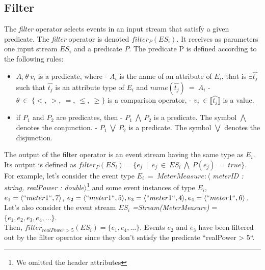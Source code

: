   \subsection{Filter}
  The \textit{filter} operator selects events in an input stream that satisfy a given predicate. The \textit{filter} operator is denoted $filter_P (ES_i)$. It receives as parameters one input stream $ES_i$ and a predicate $P$.
  The predicate P is defined according to the following rules:
  \begin{itemize}
   \item $A_i\ \theta\ v_i$ is a predicate, where
      \subitem- $A_i$ is the name of an attribute of $E_i$, that is $\exists \hat{t_j}$ such that $\hat{t_j}$ is an attribute type of $E_i$ and $name(\hat{t_j})\ =\ A_i$ 
      \subitem- $\theta\ \in\ \{<,\ >,\ =,\ \leq,\ \geq\}$ is a comparison operator,
      \subitem- $v_i\ \in \llbracket \hat{t_j}\rrbracket$ is a value. 
    \item if $P_1$ and $P_2$ are predicates, then
      \subitem- $P_1\ \bigwedge\ P_2$ is a predicate. The symbol $\bigwedge$ denotes the conjunction.
      \subitem- $P_1\ \bigvee\ P_2$ is a predicate. The symbol $\bigvee$ denotes the disjunction.
  \end{itemize}
 The output of the filter operator is an event stream having the same type as $E_i$. Its output is defined as
 $filter_P(ES_i) = \{e_j\ \mid\ e_j\ \in\ ES_i\ \bigwedge\ P(e_j)\ =\ true\}$.
  \\ For example, let's consider the event type $E_i\ =\ MeterMeasure:\langle$ \textit{meterID : string, realPower : double}$\rangle$\footnote{We omitted the header attributes} and some event instances of type $E_i$, $e_1=\langle``meter1``, 7\rangle$, $e_2=\langle``meter1``, 5\rangle, e_3=\langle``meter1``, 4\rangle, e_4=\langle``meter1``, 6\rangle$. 
  \\Let's also consider the event stream $ES_i$ \textit{=Stream(MeterMeasure)} = $\{e_1, e_2, e_3, e_4, ... \}$. 
  \\Then, $filter_{realPower > 5}(ES_i)= \{e_1, e_4, ... \}$. Events $e_2$ and $e_3$ have been filtered out by the filter operator since they don't satisfy the predicate ``realPower > 5``.
 
